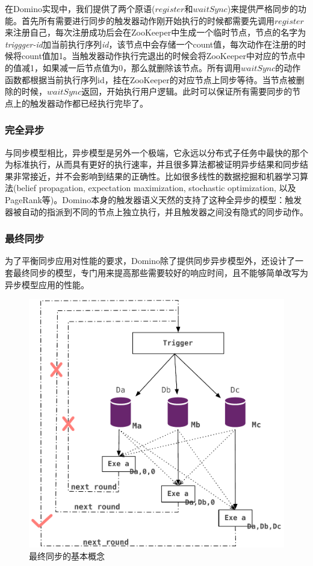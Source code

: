 在Domino实现中，我们提供了两个原语($register$和$waitSync$)来提供严格同步的功能。首先所有需要进行同步的触发器动作刚开始执行的时候都需要先调用$register$来注册自己，每次注册成功后会在ZooKeeper中生成一个临时节点，节点的名字为\textit{triggger-id}加当前执行序列\textit{id}，该节点中会存储一个count值，每次动作在注册的时候将count值加1。当触发器动作执行完退出的时候会将ZooKeeper中对应的节点中的值减1，如果减一后节点值为0，那么就删除该节点。所有调用$waitSync$的动作函数都根据当前执行序列id，挂在ZooKeeper的对应节点上同步等待。当节点被删除的时候，$waitSync$返回，开始执行用户逻辑。此时可以保证所有需要同步的节点上的触发器动作都已经执行完毕了。


\subsubsection{完全异步}

与同步模型相比，异步模型是另外一个极端，它永远以分布式子任务中最快的那个为标准执行，从而具有更好的执行速率，并且很多算法都被证明异步结果和同步结果非常接近，并不会影响到结果的正确性。比如很多线性\cite{bertsekas1989parallel}的数据挖掘和机器学习算法(belief propagation\cite{gonzalez2009residual}, expectation maximization\cite{neal1998view}, stochastic optimization\cite{macready1996criticality, smola2010architecture}, 以及PageRank等)。Domino本身的触发器语义天然的支持了这种全异步的模型：触发器被自动的指派到不同的节点上独立执行，并且触发器之间没有隐式的同步动作。

\subsubsection{最终同步}

为了平衡同步应用对性能的要求，Domino除了提供同步异步模型外，还设计了一套最终同步的模型，专门用来提高那些需要较好的响应时间，且不能够简单改写为异步模型应用的性能。

\begin{figure}[h!]
\centering
\includegraphics[width=5in]{../figures/sync.pdf}
\caption{最终同步的基本概念}
\label{fig:sync}
\end{figure}

